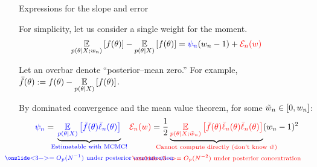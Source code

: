 \begin{frame}[t]{Expressions for the slope and error}


For simplicity, let us consider a single weight for the moment.
%
\begin{align*}
    \underset{p(\theta \vert X; w_n)}{\mathbb{E}}\left[f(\theta)\right] -
        \underset{p(\theta \vert X)}{\mathbb{E}}\left[f(\theta)\right] ={}&
        \textcolor{blue}{\psi_n} (w_n - 1) + \textcolor{red}{\mathcal{E}_n(w)}
\end{align*}

\pause

Let an overbar denote ``posterior--mean zero.''
For example, $\bar{f}(\theta) := f(\theta) - \underset{p(\theta \vert X)}{\mathbb{E}}\left[f(\theta)\right]$.

By dominated convergence and the mean value theorem, for some $\tilde{w}_n \in [0,w_n]$:
%
\begin{align*}
%
\blue{\infl_n} ={}&
\undernote{\blue{
    \expect{\p(\theta \vert \xvec)}{ \thetabar \ellbar_n(\theta)}
}}{\blue{\substack{
    \text{Estimatable with MCMC!} \\
    \text{\,}\\
    \onslide<3->{\text{$= O_p(N^{-1})$ under posterior concentration}}
}}}
&
\red{\err_n(\w)} ={}&
\frac{1}{2}
\undernote{
    \red{\expect{\p(\theta \vert \xvec; \wtil_n)}{
        \thetabar
        \ellbar_n(\theta)
        \ellbar_n(\theta)}}
}
{\red{\substack{
    \text{Cannot compute directly (don't know $\wtil$)} \\ 
    \text{\,}\\
    \onslide<3->{\text{$= O_p(N^{-2})$ under posterior concentration}}
}}}
(\w_n - 1)^2
%
\end{align*}

\end{frame}
